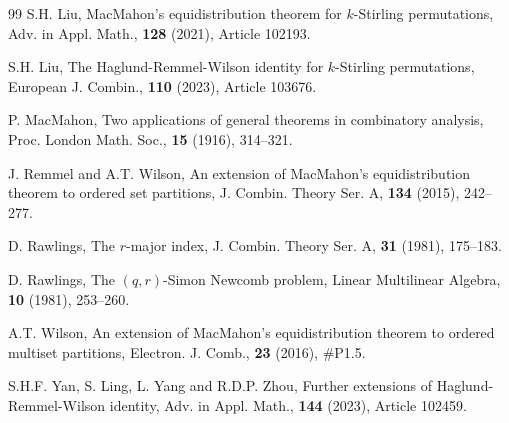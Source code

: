 \documentclass[12pt]{article}
\numberwithin{equation}{section}
\theoremstyle{plain}
\begin{document}
\begin{thebibliography}{99}
	 S.H. Liu,  MacMahon's equidistribution theorem for $k$-Stirling permutations,   Adv. in Appl. Math.,  {\bf 128} (2021), Article 102193.
	 
	 S.H. Liu, The Haglund-Remmel-Wilson identity for $k$-Stirling permutations,  European J. Combin.,  {\bf 110} (2023),
	 Article 103676.
		
		
		
		P. MacMahon, Two applications of general theorems in combinatory analysis, Proc. London Math. Soc., {\bf 15} (1916),  314--321.
		
	 J. Remmel and A.T. Wilson, An extension of MacMahon's  equidistribution
	 theorem to ordered set partitions,  J. Combin. Theory Ser. A,  {\bf 134} (2015), 242--277.
		
		D.  Rawlings,  The $r$-major index,   J. Combin. Theory Ser. A,  {\bf 31} (1981), 175--183.
		
		D. Rawlings, The $(q, r)$-Simon Newcomb problem,  Linear Multilinear Algebra,  {\bf 10} (1981),  253--260.
		
		A.T. Wilson, An extension of MacMahon's equidistribution theorem to ordered multiset partitions, Electron. J. Comb., {\bf 23} (2016), \#P1.5.
	 
	 S.H.F. Yan, S. Ling, L. Yang and R.D.P. Zhou, Further extensions of Haglund-Remmel-Wilson
	 identity, Adv. in Appl. Math.,   {\bf 144} (2023), Article 102459.
	 
		
	  
		
	\end{thebibliography}
\end{document}
